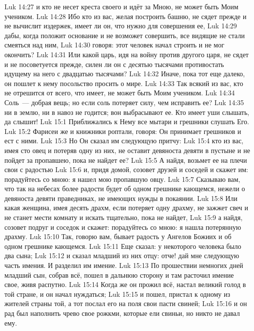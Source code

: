 \vs Luk 14:27 и кто не несет креста своего и идёт за Мною, не может быть Моим учеником.
\vs Luk 14:28 Ибо кто из вас, желая построить башню, не сядет прежде и не вычислит издержек, имеет ли он, что нужно для совершения ее,
\vs Luk 14:29 дабы, когда положит основание и не возможет совершить, все видящие не стали смеяться над ним,
\vs Luk 14:30 говоря: этот человек начал строить и не мог окончить?
\vs Luk 14:31 Или какой царь, идя на войну против другого царя, не сядет и не посоветуется прежде, силен ли он с десятью тысячами противостать идущему на него с двадцатью тысячами?
\vs Luk 14:32 Иначе, пока тот еще далеко, он пошлет к нему посольство просить о мире.
\vs Luk 14:33 Так всякий из вас, кто не отрешится от всего, что имеет, не может быть Моим учеником.
\vs Luk 14:34 Соль~--- добрая вещь; но если соль потеряет силу, чем исправить ее?
\vs Luk 14:35 ни в землю, ни в навоз не годится; вон выбрасывают ее. Кто имеет уши слышать, да слышит!
\vs Luk 15:1 Приближались к Нему все мытари и грешники слушать Его.
\vs Luk 15:2 Фарисеи же и книжники роптали, говоря: Он принимает грешников и ест с ними.
\vs Luk 15:3 Но Он сказал им следующую притчу:
\vs Luk 15:4 кто из вас, имея сто овец и потеряв одну из них, не оставит девяноста девяти в пустыне и не пойдет за пропавшею, пока не найдет ее?
\vs Luk 15:5 А найдя, возьмет ее на плечи свои с радостью
\vs Luk 15:6 и, придя домой, созовет друзей и соседей и скажет им: порадуйтесь со мною: я нашел мою пропавшую овцу.
\vs Luk 15:7 Сказываю вам, что так на небесах более радости будет об одном грешнике кающемся, нежели о девяноста девяти праведниках, не имеющих нужды в покаянии.
\vs Luk 15:8 Или какая женщина, имея десять драхм, если потеряет одну драхму, не зажжет свеч и не станет мести комнату и искать тщательно, пока не найдет,
\vs Luk 15:9 а найдя, созовет подруг и соседок и скажет: порадуйтесь со мною: я нашла потерянную драхму.
\vs Luk 15:10 Так, говорю вам, бывает радость у Ангелов Божиих и об одном грешнике кающемся.
\rsbpar\vs Luk 15:11 Еще сказал: у некоторого человека было два сына;
\vs Luk 15:12 и сказал младший из них отцу: отче! дай мне следующую  часть имения. И  разделил им имение.
\vs Luk 15:13 По прошествии немногих дней младший сын, собрав всё, пошел в дальнюю сторону и там расточил имение свое, живя распутно.
\vs Luk 15:14 Когда же он прожил всё, настал великий голод в той стране, и он начал нуждаться;
\vs Luk 15:15 и пошел, пристал к одному из жителей страны той, а тот послал его на поля свои пасти свиней;
\vs Luk 15:16 и он рад был наполнить чрево свое рожкми, которые ели свиньи, но никто не давал ему.
